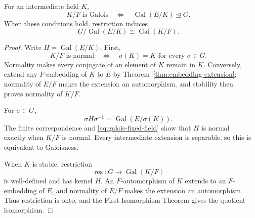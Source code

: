 \begin{proposition}\label{prop:finite-normality-refinement}
For an intermediate field \(K\),
\[
K/F\text{ is Galois}
\quad\Longleftrightarrow\quad
\operatorname{Gal}(E/K)\trianglelefteq G.
\]
When these conditions hold, restriction induces
\[
G/\operatorname{Gal}(E/K)\cong\operatorname{Gal}(K/F).
\]
\end{proposition}
\begin{proof}
Write \(H=\operatorname{Gal}(E/K)\).  First,
\begin{equation}\label{eq:galois-fixed-field}
K/F\text{ is normal}\quad\Longleftrightarrow\quad
\sigma(K)=K\text{ for every }\sigma\in G.
\end{equation}
Normality makes every conjugate of an element of \(K\) remain in \(K\).
Conversely, extend any \(F\)-embedding of \(K\) to \(E\) by
Theorem~\ref{thm:embedding-extension}; normality of \(E/F\) makes the
extension an automorphism, and stability then proves normality of \(K/F\).

For \(\sigma\in G\),
\[
\sigma H\sigma^{-1}=\operatorname{Gal}(E/\sigma(K)).
\]
The finite correspondence and \eqref{eq:galois-fixed-field} show that \(H\) is normal exactly when
\(K/F\) is normal.  Every intermediate extension is separable, so this is
equivalent to Galoisness.

When \(K\) is stable, restriction
\[
\operatorname{res}:G\longrightarrow\operatorname{Gal}(K/F)
\]
is well-defined and has kernel \(H\).  An \(F\)-automorphism of \(K\) extends
to an \(F\)-embedding of \(E\), and normality of \(E/F\) makes the extension
an automorphism.  Thus restriction is onto, and the First Isomorphism Theorem
gives the quotient isomorphism.
\end{proof}

